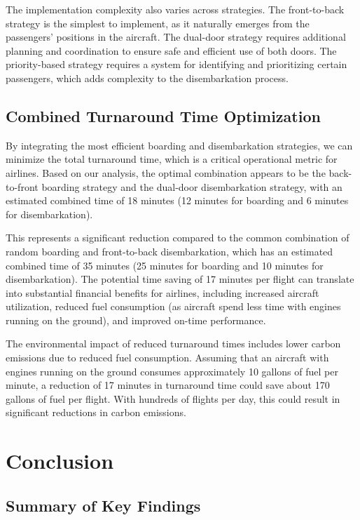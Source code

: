 \documentclass[12pt,a4paper]{article}
\begin{document}
The implementation complexity also varies across strategies. The front-to-back strategy is the simplest to implement, as it naturally emerges from the passengers' positions in the aircraft. The dual-door strategy requires additional planning and coordination to ensure safe and efficient use of both doors. The priority-based strategy requires a system for identifying and prioritizing certain passengers, which adds complexity to the disembarkation process.

\subsection{Combined Turnaround Time Optimization}

By integrating the most efficient boarding and disembarkation strategies, we can minimize the total turnaround time, which is a critical operational metric for airlines. Based on our analysis, the optimal combination appears to be the back-to-front boarding strategy and the dual-door disembarkation strategy, with an estimated combined time of 18 minutes (12 minutes for boarding and 6 minutes for disembarkation).

This represents a significant reduction compared to the common combination of random boarding and front-to-back disembarkation, which has an estimated combined time of 35 minutes (25 minutes for boarding and 10 minutes for disembarkation). The potential time saving of 17 minutes per flight can translate into substantial financial benefits for airlines, including increased aircraft utilization, reduced fuel consumption (as aircraft spend less time with engines running on the ground), and improved on-time performance.

The environmental impact of reduced turnaround times includes lower carbon emissions due to reduced fuel consumption. Assuming that an aircraft with engines running on the ground consumes approximately 10 gallons of fuel per minute, a reduction of 17 minutes in turnaround time could save about 170 gallons of fuel per flight. With hundreds of flights per day, this could result in significant reductions in carbon emissions.

\section{Conclusion}
\subsection{Summary of Key Findings}
\end{document}
